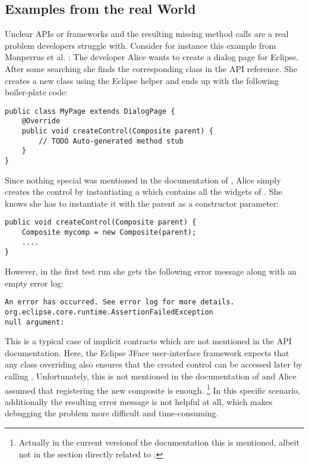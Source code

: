 \subsection{Examples from the real World}
Unclear APIs or frameworks and the resulting missing method calls are a real problem developers struggle with.
Consider for instance this example from Monperrus et al. \cite{monperrus2010detecting}:
The developer Alice wants to create a dialog page for Eclipse.
After some searching she finds the corresponding class  in the API reference.
She creates a new class using the Eclipse helper and ends up with the following boiler-plate code:
\begin{lstlisting}
public class MyPage extends DialogPage {
    @Override
    public void createControl(Composite parent) {
        // TODO Auto-generated method stub
    }
}
\end{lstlisting}
Since nothing special was mentioned in the documentation of , Alice simply creates the control by instantiating a  which contains all the widgets of .
She knows she has to instantiate it with the parent as a constructor parameter:
\begin{lstlisting}
public void createControl(Composite parent) {
    Composite mycomp = new Composite(parent);
    ....
}
\end{lstlisting}
However, in the first test run she gets the following error message along with an empty error log:
\begin{lstlisting}
An error has occurred. See error log for more details.
org.eclipse.core.runtime.AssertionFailedException
null argument:
\end{lstlisting}
This is a typical case of implicit contracts which are not mentioned in the API documentation.
Here, the Eclipse JFace user-interface framework expects that any class overriding  also ensures that the created control can be accessed later by calling .
Unfortunately, this is not mentioned in the documentation of  and Alice assumed that registering the new composite is enough.%
\footnote{Actually in the current version\footnotemark of the documentation this is mentioned, albeit not in the section directly related to .}
In this specific scenario, additionally the resulting error message is not helpful at all, which makes debugging the problem more difficult and time-consuming.

